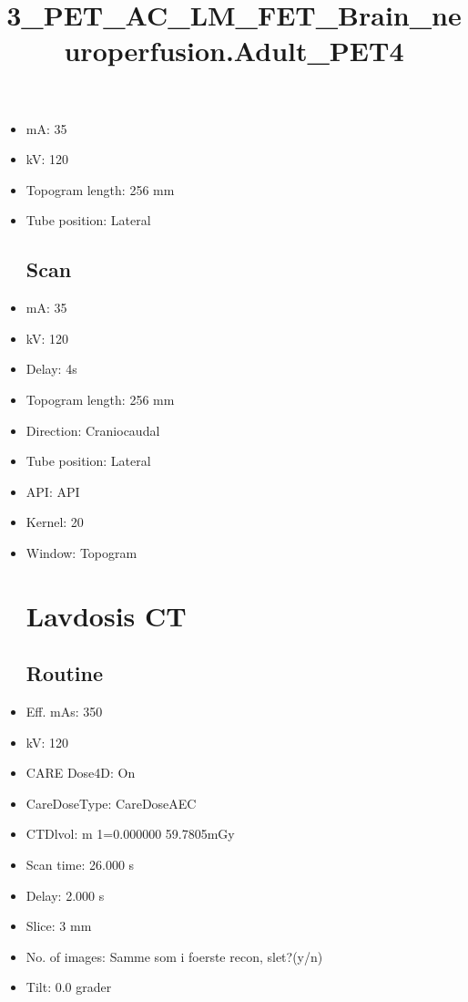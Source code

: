 \documentclass[12pt]{article}
\title{3\_PET\_AC\_LM\_FET\_Brain\_neuroperfusion.Adult\_PET4}
\begin{document}
\maketitle
\newpage
\tableofcontents
\newpage
{}


\begin{itemize}\section{Topogram}
\subsection{Routine}
\item mA: 35\item kV: 120\item Topogram length: 256 mm\item Tube position: Lateral
\subsection{Scan}\item mA: 35\item kV: 120\item Delay: 4s\item Topogram length: 256 mm\item Direction: Craniocaudal\item Tube position: Lateral\item API: API \item Kernel: 20\item Window: Topogram
\section{Lavdosis CT}
\subsection{Routine}
\item Eff. mAs: 350\item kV: 120\item CARE Dose4D: On\item CareDoseType: CareDoseAEC\item CTDlvol: m 1=0.000000 59.7805mGy\item Scan time: 26.000 s\item Delay: 2.000 s\item Slice: 3 mm\item No. of images: Samme som i foerste recon, slet?(y/n)\item Tilt: 0.0 grader

\end{itemize}
\end{document}
